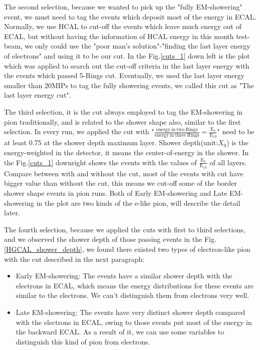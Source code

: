 \documentclass[12pt,twoside,a4paper,an,final]{cms-tdr}
\begin{document}
The second selection, because we wanted to pick up the "fully EM-showering" event, we must need to tag the events which deposit most of the energy in ECAL. Normally, we use HCAL to cut-off the events which leave much energy out of ECAL, but without having the information of HCAL energy in this month test-beam, we only could use the "poor man's solution"-"finding the last layer energy of electrons" and using it to be our cut. In the Fig.\ref{cuts_1} down left is the plot which was applied to search out the cut-off criteria in the last layer energy with the events which passed 5-Rings cut. Eventually, we used the last layer energy smaller than 20MIPs to tag the fully showering events, we called this cut as "The last layer energy cut".

The third selection, it is the cut always employed to tag the EM-showering in pion traditionally, and is related to the shower shape also, similar to the first selection. In every run, we applied the cut with "$\frac{\mathrm{energy \ in \ two \ Rings}}{\mathrm{energy \ in \ three \ Rings}} = \frac{\mathrm{E_{7}}}{\mathrm{E_{19}}}$" need to be at least 0.75 at the shower depth maximum layer. Shower depth(unit:$X_{0}$) is the energy-weighted in the detector, it means the center-of-energy in the shower. In the Fig.\ref{cuts_1} downright shows the events with the values of $\frac{\mathrm{E_{7}}}{\mathrm{E_{19}}}$ of all layers. Compare between with and without the cut, most of the events with cut have bigger value than without the cut, this means we cut-off some of the border shower shape events in pion runs. Both of Early EM-showering and Late EM-showering in the plot are two kinds of the e-like pion, will describe the detail later.

The fourth selection, because we applied the cuts with first to third selections, and we observed the shower depth of those passing events in the Fig.\ref{HGCAL_shower_depth}, we found there existed two types of electron-like pion with the cut described in the next paragraph:
\begin{itemize}
\item Early EM-showering: The events have a similar shower depth with the electrons in ECAL, which means the energy distributions for these events are similar to the electrons. We can't distinguish them from electrons very well.
\item Late  EM-showering: The events have very distinct shower depth compared with the electrons in ECAL, owing to those events put most of the energy in the backward ECAL. As a result of it, we can use some variables to distinguish this kind of pion from electrons.
\end{itemize}
\end{document}
